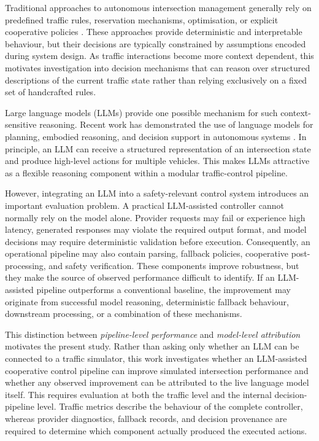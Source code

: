 \documentclass[letterpaper,10pt,conference]{ieeeconf}
\begin{document}
Traditional approaches to autonomous intersection management generally rely on predefined traffic rules, reservation mechanisms, optimisation, or explicit cooperative policies \cite{Dresner2008,Safarov2022,Zhao2025}. These approaches provide deterministic and interpretable behaviour, but their decisions are typically constrained by assumptions encoded during system design. As traffic interactions become more context dependent, this motivates investigation into decision mechanisms that can reason over structured descriptions of the current traffic state rather than relying exclusively on a fixed set of handcrafted rules.



Large language models (LLMs) provide one possible mechanism for such context-sensitive reasoning. Recent work has demonstrated the use of language models for planning, embodied reasoning, and decision support in autonomous systems \cite{Huang2022,Driess2023,Wen2023,Jin2023,Cui2024,Yang2024,Hou2025,Li2024}. In principle, an LLM can receive a structured representation of an intersection state and produce high-level actions for multiple vehicles. This makes LLMs attractive as a flexible reasoning component within a modular traffic-control pipeline.



However, integrating an LLM into a safety-relevant control system introduces an important evaluation problem. A practical LLM-assisted controller cannot normally rely on the model alone. Provider requests may fail or experience high latency, generated responses may violate the required output format, and model decisions may require deterministic validation before execution. Consequently, an operational pipeline may also contain parsing, fallback policies, cooperative post-processing, and safety verification. These components improve robustness, but they make the source of observed performance difficult to identify. If an LLM-assisted pipeline outperforms a conventional baseline, the improvement may originate from successful model reasoning, deterministic fallback behaviour, downstream processing, or a combination of these mechanisms.



This distinction between \emph{pipeline-level performance} and \emph{model-level attribution} motivates the present study. Rather than asking only whether an LLM can be connected to a traffic simulator, this work investigates whether an LLM-assisted cooperative control pipeline can improve simulated intersection performance and whether any observed improvement can be attributed to the live language model itself. This requires evaluation at both the traffic level and the internal decision-pipeline level. Traffic metrics describe the behaviour of the complete controller, whereas provider diagnostics, fallback records, and decision provenance are required to determine which component actually produced the executed actions.
\end{document}
